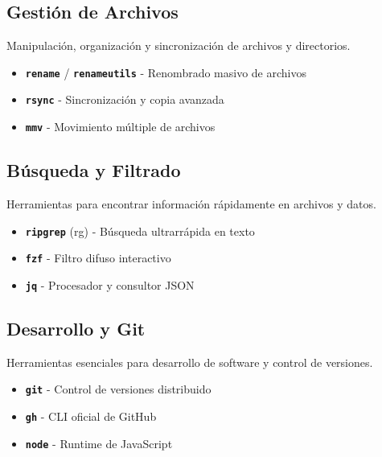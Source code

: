 \documentclass[
  11pt,
  letterpaper,
  oneside,
  openany]{scrbook}
\providecommand{\tightlist}{%
  \setlength{\itemsep}{0pt}\setlength{\parskip}{0pt}}
\begin{document}
\subsection*{Gestión de Archivos}\label{gestiuxf3n-de-archivos}

Manipulación, organización y sincronización de archivos y directorios.

\begin{itemize}
\tightlist
\item
  \textbf{\texttt{rename}} / \textbf{\texttt{renameutils}} - Renombrado
  masivo de archivos
\item
  \textbf{\texttt{rsync}} - Sincronización y copia avanzada
\item
  \textbf{\texttt{mmv}} - Movimiento múltiple de archivos
\end{itemize}

\subsection*{Búsqueda y Filtrado}\label{buxfasqueda-y-filtrado}

Herramientas para encontrar información rápidamente en archivos y datos.

\begin{itemize}
\tightlist
\item
  \textbf{\texttt{ripgrep}} (rg) - Búsqueda ultrarrápida en texto
\item
  \textbf{\texttt{fzf}} - Filtro difuso interactivo
\item
  \textbf{\texttt{jq}} - Procesador y consultor JSON
\end{itemize}

\subsection*{Desarrollo y Git}\label{desarrollo-y-git}

Herramientas esenciales para desarrollo de software y control de
versiones.

\begin{itemize}
\tightlist
\item
  \textbf{\texttt{git}} - Control de versiones distribuido
\item
  \textbf{\texttt{gh}} - CLI oficial de GitHub\\
\item
  \textbf{\texttt{node}} - Runtime de JavaScript
\end{itemize}
\end{document}
